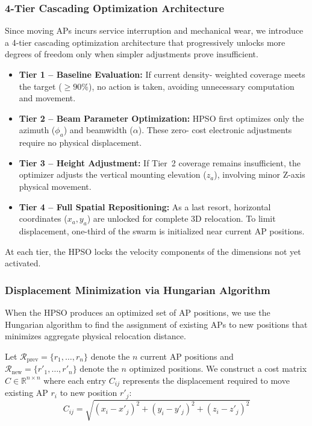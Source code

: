 \documentclass[conference]{IEEEtran}
\begin{document}
	\subsubsection{4-Tier Cascading Optimization Architecture}
	
	Since moving APs incurs service interruption and mechanical wear, we introduce a 4-tier cascading optimization architecture that progressively unlocks more degrees of freedom only when simpler adjustments prove insufficient.
	
	\begin{itemize}                                                          
		\item \textbf{Tier 1 -- Baseline Evaluation:} If current density-    
		weighted coverage meets the target ($\ge 90\%$), no action is taken,       
		avoiding unnecessary computation and movement.
		
		\item \textbf{Tier 2 -- Beam Parameter Optimization:} HPSO first     
		optimizes only the azimuth ($\phi_a$) and beamwidth ($\alpha$). These zero-
		cost electronic adjustments require no physical displacement.
		
		\item \textbf{Tier 3 -- Height Adjustment:} If Tier~2 coverage       
		remains insufficient, the optimizer adjusts the vertical mounting elevation
		($z_a$), involving minor Z-axis physical movement.
		
		\item \textbf{Tier 4 -- Full Spatial Repositioning:} As a last resort,
		horizontal coordinates ($x_a, y_a$) are unlocked for complete 3D relocation.
		To limit displacement, one-third of the swarm is initialized near current  
		AP positions.
	\end{itemize}
	
	
	At each tier, the HPSO locks the velocity components of the dimensions not yet activated.
	
	\subsubsection{Displacement Minimization via Hungarian Algorithm}
	
	When the HPSO produces an optimized set of AP positions, we use the Hungarian algorithm \cite{b12} to find the assignment of existing APs to new positions that minimizes aggregate physical relocation distance.
	
	Let $\mathcal{R}_{\text{prev}} = \{r_1, \ldots, r_n\}$ denote the $n$ current AP positions and $\mathcal{R}_{\text{new}} = \{r'_1, \ldots, r'_n\}$ denote the $n$ optimized positions. We construct a cost matrix $C \in \mathbb{R}^{n \times n}$ where each entry $C_{ij}$ represents the displacement required to move existing AP $r_i$ to new position $r'_j$:
	\begin{equation}
		C_{ij} = \sqrt{(x_i - x'_j)^2 + (y_i - y'_j)^2 + (z_i - z'_j)^2}
		\label{eq:cost_matrix}
	\end{equation}
	
\end{document}
